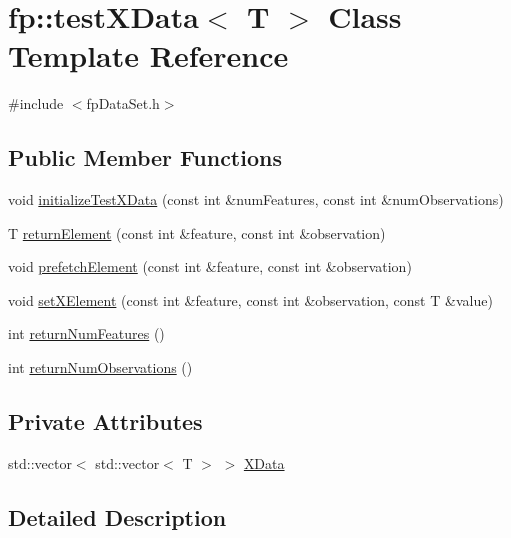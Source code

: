 \hypertarget{classfp_1_1testXData}{}\section{fp\+:\+:test\+X\+Data$<$ T $>$ Class Template Reference}
\label{classfp_1_1testXData}


{\ttfamily \#include $<$fp\+Data\+Set.\+h$>$}

\subsection*{Public Member Functions}
\begin{DoxyCompactItemize}
\item 
void \hyperlink{classfp_1_1testXData_ab0f2e34632495f758cc211f7a73faa8a}{initialize\+Test\+X\+Data} (const int \&num\+Features, const int \&num\+Observations)
\item 
T \hyperlink{classfp_1_1testXData_af5e145dd37b992a7b15cfc47e74a3cbe}{return\+Element} (const int \&feature, const int \&observation)
\item 
void \hyperlink{classfp_1_1testXData_afdecc334182bad0711305abc716ed359}{prefetch\+Element} (const int \&feature, const int \&observation)
\item 
void \hyperlink{classfp_1_1testXData_a3fc6beff70a4e516a248685681a8b2e1}{set\+X\+Element} (const int \&feature, const int \&observation, const T \&value)
\item 
int \hyperlink{classfp_1_1testXData_a1be829ef319b4ad983dd5ff2baa042d9}{return\+Num\+Features} ()
\item 
int \hyperlink{classfp_1_1testXData_a607ffec0652bccbd7bde861dd67afa81}{return\+Num\+Observations} ()
\end{DoxyCompactItemize}
\subsection*{Private Attributes}
\begin{DoxyCompactItemize}
\item 
std\+::vector$<$ std\+::vector$<$ T $>$ $>$ \hyperlink{classfp_1_1testXData_a3a7fe96fa4c950d66be4e9e8faa70e9c}{X\+Data}
\end{DoxyCompactItemize}


\subsection{Detailed Description}
